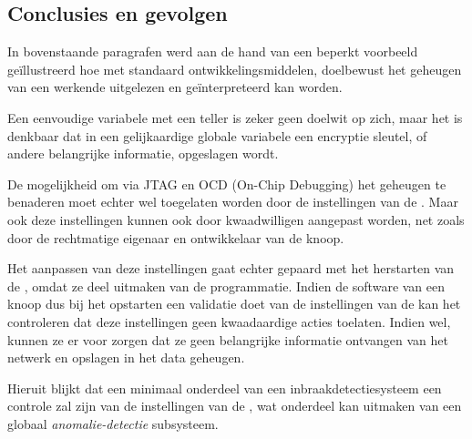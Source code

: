 \subsection{Conclusies en gevolgen}

In bovenstaande paragrafen werd aan de hand van een beperkt voorbeeld
ge\"illustreerd hoe met standaard ontwikkelingsmiddelen, doelbewust het
geheugen van een werkende \mcu uitgelezen en ge\"interpreteerd kan worden.

Een eenvoudige variabele met een teller is zeker geen doelwit op zich, maar het
is denkbaar dat in een gelijkaardige globale variabele een encryptie sleutel,
of andere belangrijke informatie, opgeslagen wordt.

De mogelijkheid om via JTAG en OCD (On-Chip Debugging) het geheugen te
benaderen moet echter wel toegelaten worden door de instellingen van de \mcu.
Maar ook deze instellingen kunnen ook door kwaadwilligen aangepast worden, net
zoals door de rechtmatige eigenaar en ontwikkelaar van de knoop.

Het aanpassen van deze instellingen gaat echter gepaard met het herstarten van
de \mcu, omdat ze deel uitmaken van de programmatie. Indien de software van een
knoop dus bij het opstarten een validatie doet van de instellingen van de \mcu
kan het controleren dat deze instellingen geen kwaadaardige acties toelaten.
Indien wel, kunnen ze er voor zorgen dat ze geen belangrijke informatie
ontvangen van het netwerk en opslagen in het data geheugen.

Hieruit blijkt dat een minimaal onderdeel van een inbraakdetectiesysteem een
controle zal zijn van de instellingen van de \mcu, wat onderdeel kan uitmaken
van een globaal \emph{anomalie-detectie} subsysteem.
